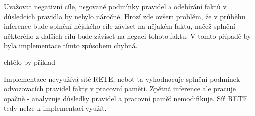 Uvažovat negativní cíle, negované podmínky pravidel a odebírání faktů v
důsledcích pravidla by nebylo náročné. Hrozí zde ovšem problém, že v průběhu
inference bude splnění nějakého cíle záviset na nějakém faktu, načež splnění
některého z dalších cílů bude záviset na negaci tohoto faktu. V tomto případě by
byla implementace tímto způsobem chybná.

\begin{framed}
  chtělo by příklad
\end{framed}

Implementace nevyužívá sítě RETE, neboť ta vyhodnocuje splnění podmínek
odvozovacích pravidel fakty v pracovní paměti. Zpětná inference ale pracuje
opačně - analyzuje důsledky pravidel a pracovní paměť nemodifikuje. Síť RETE
tedy nelze k implementaci využít.
